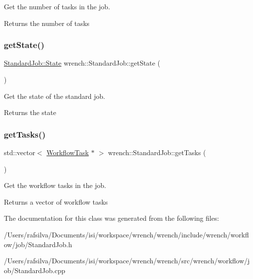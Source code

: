 Get the number of tasks in the job. 

\begin{DoxyReturn}{Returns}
the number of tasks 
\end{DoxyReturn}
\mbox{\label{classwrench_1_1_standard_job_a1fd45aa2f3ab8818d7bbf6d8d6a31a5c}} 
\subsubsection{\texorpdfstring{get\+State()}{getState()}}
{\footnotesize\ttfamily \hyperlink{classwrench_1_1_standard_job_adad8bdfd5eb774da5be290864ce89c67}{Standard\+Job\+::\+State} wrench\+::\+Standard\+Job\+::get\+State (\begin{DoxyParamCaption}{ }\end{DoxyParamCaption})}



Get the state of the standard job. 

\begin{DoxyReturn}{Returns}
the state 
\end{DoxyReturn}
\mbox{\label{classwrench_1_1_standard_job_a122e212d0136c5559b7fc38b58f8c377}} 
\subsubsection{\texorpdfstring{get\+Tasks()}{getTasks()}}
{\footnotesize\ttfamily std\+::vector$<$ \hyperlink{classwrench_1_1_workflow_task}{Workflow\+Task} $\ast$ $>$ wrench\+::\+Standard\+Job\+::get\+Tasks (\begin{DoxyParamCaption}{ }\end{DoxyParamCaption})}



Get the workflow tasks in the job. 

\begin{DoxyReturn}{Returns}
a vector of workflow tasks 
\end{DoxyReturn}


The documentation for this class was generated from the following files\+:\begin{DoxyCompactItemize}
\item 
/\+Users/rafsilva/\+Documents/isi/workspace/wrench/wrench/include/wrench/workflow/job/Standard\+Job.\+h\item 
/\+Users/rafsilva/\+Documents/isi/workspace/wrench/wrench/src/wrench/workflow/job/Standard\+Job.\+cpp\end{DoxyCompactItemize}
